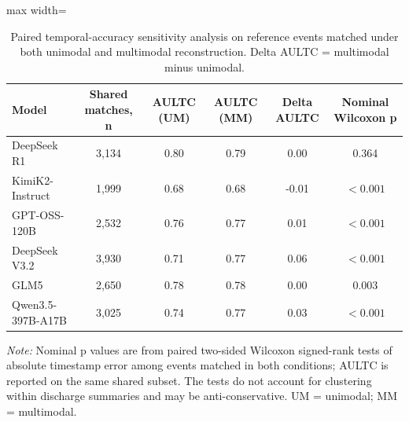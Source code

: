 \begin{table}[htbp]
\caption{Paired temporal-accuracy sensitivity analysis on reference events matched under both unimodal and multimodal reconstruction. Delta AULTC = multimodal minus unimodal.}
\ChEightTableBodyStart
\begin{ChEightFloatBody}

\small

\centering
\begin{adjustbox}{max width=\textwidth}
\begin{tabular}{@{}lccccc@{}}
\toprule
\textbf{Model} & \textbf{Shared matches, n} & \textbf{AULTC (UM)} & \textbf{AULTC (MM)} & \textbf{Delta AULTC} & \textbf{Nominal Wilcoxon p} \\
\midrule
DeepSeek R1 & 3,134 & 0.80 & 0.79 & 0.00 & 0.364 \\
KimiK2-Instruct & 1,999 & 0.68 & 0.68 & -0.01 & $<0.001$ \\
GPT-OSS-120B & 2,532 & 0.76 & 0.77 & 0.01 & $<0.001$ \\
DeepSeek V3.2 & 3,930 & 0.71 & 0.77 & 0.06 & $<0.001$ \\
GLM5 & 2,650 & 0.78 & 0.78 & 0.00 & 0.003 \\
Qwen3.5-397B-A17B & 3,025 & 0.74 & 0.77 & 0.03 & $<0.001$ \\
\bottomrule
\end{tabular}
\end{adjustbox}
\par
\begin{minipage}{\textwidth}
\footnotesize\textit{Note:} Nominal p values are from paired two-sided Wilcoxon signed-rank tests of absolute timestamp error among events matched in both conditions; AULTC is reported on the same shared subset. The tests do not account for clustering within discharge summaries and may be anti-conservative. UM = unimodal; MM = multimodal.
\end{minipage}

\end{ChEightFloatBody}
\end{table}
